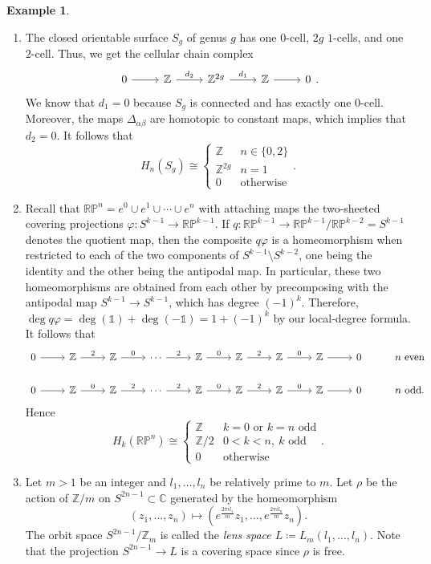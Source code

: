 \documentclass[10pt,letterpaper,cm]{nupset}
\theoremstyle{definition}
\newtheorem{exmp}[definition]{Example}
\theoremstyle{theorem}
\theoremstyle{remark}
\newcommand{\C}{\mathbb C}
\newcommand{\RP}{\mathbb{RP}}
\newcommand{\Z}{\mathbb Z}
\newcommand{\1}{\mathbb{1}}
\newcommand{\0}{\vec 0}
\begin{document}
\begin{exmp} $ $
\begin{enumerate}
\item The closed orientable surface $S_g$ of genus $g$ has one $0$-cell, $2g$ $1$-cells, and one $2$-cell. Thus, we get the cellular chain complex 
\[
\begin{tikzcd}
0 \arrow[r] & \Z \arrow[r, "d_2"] & \Z^{2g} \arrow[r, "d_1"] & \Z \arrow[r] & 0
\end{tikzcd}
.\] We know that $d_1=0$ because $S_g$ is connected and has exactly one $0$-cell. Moreover, the maps $\Delta_{\alpha{\beta}}$ are homotopic to constant maps, which implies that $d_2 =0$. It follows that $$  H_n(S_g) \cong \begin{cases}  \Z & n\in \{0,2\} \\ \Z^{2g} & n =1 \\ 0 & \text{otherwise} \end{cases}  .$$
\item Recall that $\RP^n = e^0 \cup e^1 \cup \cdots \cup e^n$ with attaching maps the two-sheeted covering projections $\varphi : S^{k-1} \to \RP^{k-1}$. If $q : \RP^{k-1} \to \RP^{k-1}/\RP^{k-2} = S^{k-1}$ denotes the quotient map, then the composite $q{\varphi}$ is a homeomorphism when restricted to each of the two components of $S^{k-1} \setminus S^{k-2}$, one being the identity and the other being the antipodal map. In particular, these two homeomorphisms are obtained from each other by precomposing with the antipodal map $S^{k-1} \to S^{k-1}$, which has degree $({-1})^k$. Therefore, $\deg{q\varphi} = \deg(\1)+\deg({-\1}) = 1+({-1})^k$ by our local-degree formula. It follows that
\[
\begin{tikzcd}
0 \arrow[r] & \Z \arrow[r, "2"] & \Z \arrow[r, "0"] & \cdots \arrow[r, "2"] & \Z \arrow[r, "0"] & \Z \arrow[r, "2"] & \Z \arrow[r, "0"] & \Z \arrow[r] & 0 & n \text{ even} \\
0 \arrow[r] & \Z \arrow[r, "0"] & \Z \arrow[r, "2"] & \cdots \arrow[r, "2"] & \Z \arrow[r, "0"] & \Z \arrow[r, "2"] & \Z \arrow[r, "0"] & \Z \arrow[r] & 0 & n \text{ odd}.
\end{tikzcd}
\] Hence $$ H_k(\RP^n) \cong \begin{cases}   \Z & k=0 \text{ or } k=n \text{ odd} \\ \Z/2 & 0< k<n, \ k \text{ odd}  \\ 0 & \text{otherwise} \end{cases}  .$$
\item Let $m>1$ be an integer and $l_1, \ldots, l_n$ be relatively prime to $m$. Let $\rho$ be the action of $\Z/m$ on $S^{2n-1} \subset \C$ generated by the homeomorphism $$(z_1, \ldots, z_n) \mapsto (e^{\frac{2\pi il_1}{m}}z_1, \ldots, e^{\frac{2\pi il_n}{m}}z_n).$$  The orbit space $S^{2n-1}/\Z_m$ is called the \textit{lens space $L\coloneqq  L_m(l_1, \ldots, l_n)$}. Note that the projection $S^{2n-1} \to L$ is a covering space since $\rho$ is free.
\end{enumerate}

\end{exmp}
\end{document}
